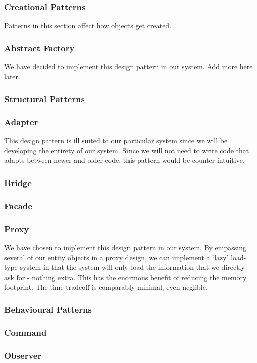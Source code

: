 \documentclass[12pt,letterpaper]{article}
\begin{document}
\subsubsection{Creational Patterns}
Patterns in this section affect how objects get created. 
\subsubsection*{Abstract Factory}
We have decided to implement this design pattern in our system. Add more here later.
\subsubsection{Structural Patterns}
\subsubsection*{Adapter}
This design pattern is ill suited to our particular system since we will be developing the entirety of our system. Since we will not need to write code that adapts between newer and older code, this pattern would be counter-intuitive.
\subsubsection*{Bridge}
\subsubsection*{Facade}
\subsubsection*{Proxy}
We have chosen to implement this design pattern in our system. By empassing several of our entity objects in a proxy design, we can implement a `lazy' load-type system in that the system will only load the information that we directly ask for - nothing extra. This has the enormous benefit of reducing the memory footprint. The time tradeoff is comparably minimal, even neglible. 
\subsubsection{Behavioural Patterns}
\subsubsection*{Command}
\subsubsection*{Observer}
\end{document}
